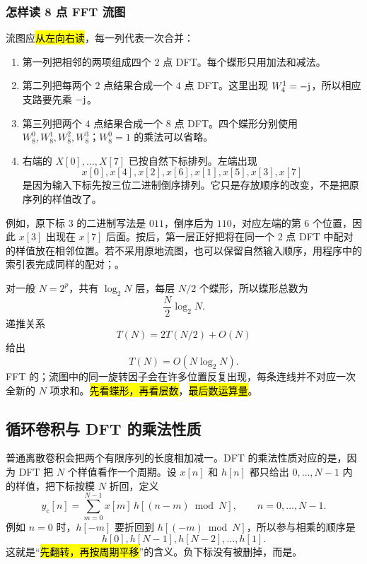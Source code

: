\subsubsection{怎样读 8 点 FFT 流图}
\label{sec:fft-flow-reading}

流图应\hl{从左向右读}，每一列代表一次合并：

\begin{enumerate}
  \item 第一列把相邻的两项组成四个 $2$ 点 DFT。每个蝶形只用加法和减法。
  \item 第二列把每两个 $2$ 点结果合成一个 $4$ 点 DFT。这里出现 $W_4^1=-\mathrm{j}$，所以相应支路要先乘 $-\mathrm{j}$。
  \item 第三列把两个 $4$ 点结果合成一个 $8$ 点 DFT。四个蝶形分别使用 $W_8^0,W_8^1,W_8^2,W_8^3$；$W_8^0=1$ 的乘法可以省略。
  \item 右端的 $X[0],\ldots,X[7]$ 已按自然下标排列。左端出现
    \[
      x[0],x[4],x[2],x[6],x[1],x[5],x[3],x[7]
    \]
    是因为输入下标先按三位二进制倒序排列。它只是存放顺序的改变，不是把原序列的样值改了。
\end{enumerate}

例如，原下标 $3$ 的二进制写法是 $011$，倒序后为 $110$，对应左端的第 $6$ 个位置，因此 $x[3]$ 出现在 $x[7]$ 后面。按后，第一层正好把将在同一个 $2$ 点 DFT 中配对的样值放在相邻位置。若不采用原地流图，也可以保留自然输入顺序，用程序中的索引表完成同样的配对；。

对一般 $N=2^p$，共有 $\log_2N$ 层，每层 $N/2$ 个蝶形，所以蝶形总数为
\[
  \frac{N}{2}\log_2N.
\]
递推关系
\[
  T(N)=2T(N/2)+O(N)
\]
给出
\[
  T(N)=O(N\log_2N).
\]
FFT 的；流图中的同一旋转因子会在许多位置反复出现，每条连线并不对应一次全新的 $N$ 项求和。\hl{先看蝶形，再看层数}，\hl{最后数运算量}。

\subsection{循环卷积与 DFT 的乘法性质}
\label{sec:dft-circular-convolution}

普通离散卷积会把两个有限序列的长度相加减一。DFT 的乘法性质对应的是，因为 DFT 把 $N$ 个样值看作一个周期。设 $x[n]$ 和 $h[n]$ 都只给出 $0,\ldots,N-1$ 内的样值，把下标按模 $N$ 折回，定义
\begin{equation}
  y_{\mathrm c}[n]
  =\sum_{m=0}^{N-1}x[m]\,
    h[(n-m)\bmod N],
  \qquad n=0,\ldots,N-1.
  \label{eq:circular-convolution}
\end{equation}
例如 $n=0$ 时，$h[-m]$ 要折回到 $h[(-m)\bmod N]$，所以参与相乘的顺序是
\[
  h[0],h[N-1],h[N-2],\ldots,h[1].
\]
这就是“\hl{先翻转，再按周期平移}”的含义。负下标没有被删掉，而是。

